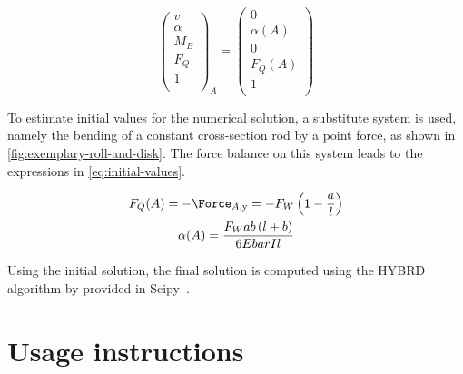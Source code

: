 \documentclass[11pt]{PyRollDocs}
\begin{document}
    \begin{equation}
        \begin{pmatrix}
            v  \\[2pt]
            \alpha     \\[2pt]
            M_B \\[2pt]
            F_Q   \\[2pt]
            1              \\[2pt]
        \end{pmatrix}_{A}
        =
        \begin{pmatrix}
            0  \\[2pt]
            \alpha(A)     \\[2pt]
            0 \\[2pt]
            F_Q(A)   \\[2pt]
            1              \\[2pt]
        \end{pmatrix}
        \label{eq:initial-vector}
    \end{equation}

    To estimate initial values for the numerical solution, a substitute system is used, namely the bending of a constant cross-section rod by a point force, as shown in \autoref{fig:exemplary-roll-and-disk}.
    The force balance on this system leads to the expressions in \autoref{eq:initial-values}.

    \begin{subequations}
        \begin{gather}
            F_Q(A) = -\Force_{A, \mathrm{y}} = -F_W \left( 1 - \frac{a}{l} \right)
            \label{eq:bearing-force}\\
            \alpha(A) = \frac{F_W a b \left( l + b \right)}{6 E bar{I} l}
            \label{eq:inclination}
        \end{gather}
        \label{eq:initial-values}
    \end{subequations}

    Using the initial solution, the final solution is computed using the HYBRD algorithm by \textcite{Powell} provided in Scipy~\cite{Virtanen_Gommers_Oliphant_Haberland_Reddy_Cournapeau_Burovski_Peterson_Weckesser_Bright_2020}.


    \section{Usage instructions}\label{sec:usage-instructions}
\end{document}
